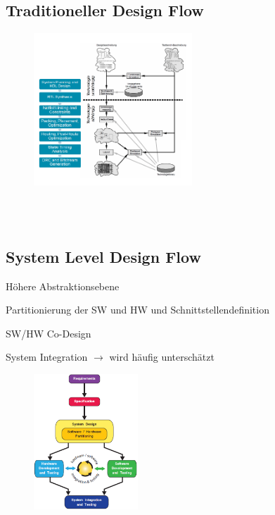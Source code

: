 \begin{multicols}{2} 
    \subsection{Traditioneller Design Flow}
     \begin{figure}[H]
     	\includegraphics[width=0.53\textwidth]{images/Design_Flow_traditionell.png}
     \end{figure}
     \ \\ \ \\
    \subsection{System Level Design Flow} 
    \begin{compactitem}
        \item Höhere Abstraktionsebene
        \item Partitionierung der SW und HW und Schnittstellendefinition
        \item SW/HW Co-Design
        \item System Integration $\rightarrow$ wird häufig unterschätzt
    \end{compactitem}
    \begin{figure}[H]
     	\includegraphics[width=0.35\textwidth]{images/Design_Flow_System_Level.png}
     \end{figure}
\end{multicols}
